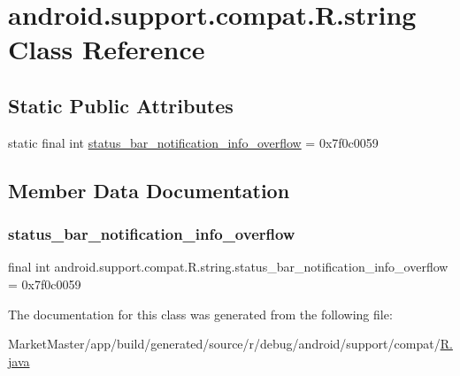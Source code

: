 \hypertarget{classandroid_1_1support_1_1compat_1_1R_1_1string}{}\section{android.\+support.\+compat.\+R.\+string Class Reference}
\label{classandroid_1_1support_1_1compat_1_1R_1_1string}
\subsection*{Static Public Attributes}
\begin{DoxyCompactItemize}
\item 
static final int \mbox{\hyperlink{classandroid_1_1support_1_1compat_1_1R_1_1string_a7529efba925b9ba0a8d7ae1cab99f9db}{status\+\_\+bar\+\_\+notification\+\_\+info\+\_\+overflow}} = 0x7f0c0059
\end{DoxyCompactItemize}


\subsection{Member Data Documentation}
\mbox{\label{classandroid_1_1support_1_1compat_1_1R_1_1string_a7529efba925b9ba0a8d7ae1cab99f9db}} 
\subsubsection{\texorpdfstring{status\+\_\+bar\+\_\+notification\+\_\+info\+\_\+overflow}{status\_bar\_notification\_info\_overflow}}
{\footnotesize\ttfamily final int android.\+support.\+compat.\+R.\+string.\+status\+\_\+bar\+\_\+notification\+\_\+info\+\_\+overflow = 0x7f0c0059\hspace{0.3cm}{\ttfamily [static]}}



The documentation for this class was generated from the following file\+:\begin{DoxyCompactItemize}
\item 
Market\+Master/app/build/generated/source/r/debug/android/support/compat/\mbox{\hyperlink{debug_2android_2support_2compat_2R_8java}{R.\+java}}\end{DoxyCompactItemize}
